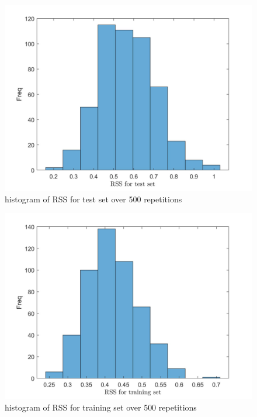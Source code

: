\documentclass{article}
\begin{document}
	
	
	
	
	
\begin{figure}[h]
	\centering
	\includegraphics[scale = 0.2]{figures/q8_1_RSStest.jpg}
	\caption{histogram of RSS for test set over 500 repetitions}
	\label{fig:Q8_1_RSStest}
\end{figure}

\begin{figure}[h]
	\centering
	\includegraphics[scale = 0.2]{figures/q8_RSStrain.jpg}
	\caption{histogram of RSS for training set over 500 repetitions}
	\label{fig:Q8_RSStrain}
\end{figure}
	
\end{document}
